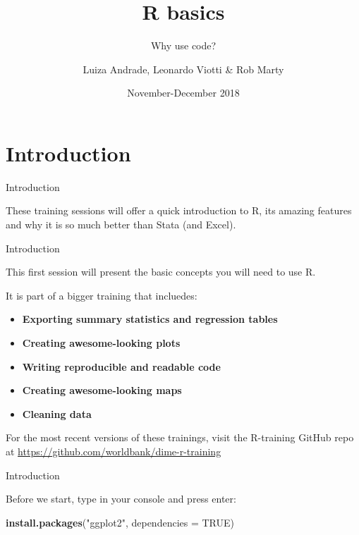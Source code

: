 \documentclass[ignorenonframetext,]{beamer}
\title{R basics}
\subtitle{Why use code?}
\author{Luiza Andrade, Leonardo Viotti \& Rob Marty}
\date{November-December 2018}
\newenvironment{Shaded}{\begin{snugshade}}{\end{snugshade}}
\newcommand{\KeywordTok}[1]{\textcolor[rgb]{0.13,0.29,0.53}{\textbf{#1}}}
\newcommand{\DataTypeTok}[1]{\textcolor[rgb]{0.13,0.29,0.53}{#1}}
\newcommand{\StringTok}[1]{\textcolor[rgb]{0.31,0.60,0.02}{#1}}
\newcommand{\OtherTok}[1]{\textcolor[rgb]{0.56,0.35,0.01}{#1}}
\newcommand{\NormalTok}[1]{#1}
\providecommand{\tightlist}{%
  \setlength{\itemsep}{0pt}\setlength{\parskip}{0pt}}
\begin{document}
\frame{\titlepage}

\section{Introduction}\label{introduction}

\begin{frame}{Introduction}

These training sessions will offer a quick introduction to R, its
amazing features and why it is so much better than Stata (and Excel).

\end{frame}

\begin{frame}{Introduction}

This first session will present the basic concepts you will need to use
R.

It is part of a bigger training that incluedes:

\begin{itemize}
\tightlist
\item
  \textbf{Exporting summary statistics and regression tables}
\item
  \textbf{Creating awesome-looking plots}
\item
  \textbf{Writing reproducible and readable code}
\item
  \textbf{Creating awesome-looking maps}
\item
  \textbf{Cleaning data}
\end{itemize}

For the most recent versions of these trainings, visit the R-training
GitHub repo at \url{https://github.com/worldbank/dime-r-training}

\end{frame}

\begin{frame}[fragile]{Introduction}

\begin{block}{Before we start, type in your console and press enter:}

\begin{Shaded}
\begin{Highlighting}[]
  \KeywordTok{install.packages}\NormalTok{(}\StringTok{"ggplot2"}\NormalTok{, }\DataTypeTok{dependencies =} \OtherTok{TRUE}\NormalTok{)}
\end{Highlighting}
\end{Shaded}

\end{block}

\end{frame}
\end{document}
